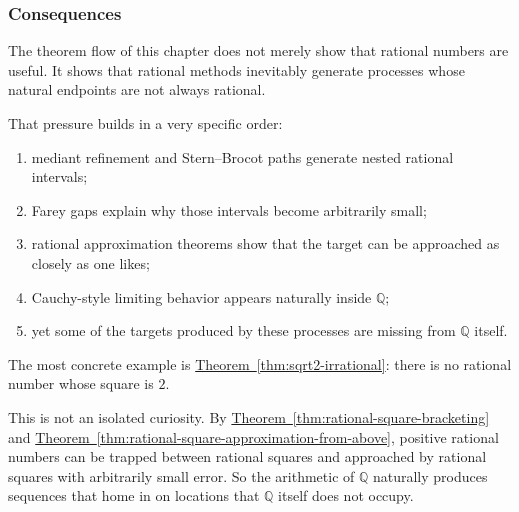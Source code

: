
\subsubsection{Consequences}

\begin{remark}
The theorem flow of this chapter does not merely show that rational
numbers are useful. It shows that rational methods inevitably generate
processes whose natural endpoints are not always rational.

That pressure builds in a very specific order:
\begin{enumerate}
\item mediant refinement and Stern--Brocot paths generate nested
      rational intervals;
\item Farey gaps explain why those intervals become arbitrarily small;
\item rational approximation theorems show that the target can be
      approached as closely as one likes;
\item Cauchy-style limiting behavior appears naturally inside
      $\mathbb{Q}$;
\item yet some of the targets produced by these processes are missing
      from $\mathbb{Q}$ itself.
\end{enumerate}
\end{remark}

\begin{remark}
The most concrete example is
\hyperref[thm:sqrt2-irrational]{Theorem~\ref*{thm:sqrt2-irrational}}:
there is no rational number whose square is $2$.

This is not an isolated curiosity. By
\hyperref[thm:rational-square-bracketing]{Theorem~\ref*{thm:rational-square-bracketing}}
and
\hyperref[thm:rational-square-approximation-from-above]{Theorem~\ref*{thm:rational-square-approximation-from-above}},
positive rational numbers can be trapped between rational squares and
approached by rational squares with arbitrarily small error. So the
arithmetic of $\mathbb{Q}$ naturally produces sequences that home in on
locations that $\mathbb{Q}$ itself does not occupy.
\end{remark}


